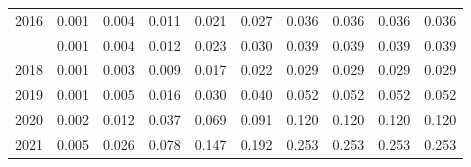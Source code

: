 \documentclass[
]{article}
\begin{document}
\begin{longtable}[t]{lrrrrrrrrr}
2016 & 0.001 & 0.004 & 0.011 & 0.021 & 0.027 & 0.036 & 0.036 & 0.036 & 0.036\\
\addlinespace
2017 & 0.001 & 0.004 & 0.012 & 0.023 & 0.030 & 0.039 & 0.039 & 0.039 & 0.039\\
2018 & 0.001 & 0.003 & 0.009 & 0.017 & 0.022 & 0.029 & 0.029 & 0.029 & 0.029\\
2019 & 0.001 & 0.005 & 0.016 & 0.030 & 0.040 & 0.052 & 0.052 & 0.052 & 0.052\\
2020 & 0.002 & 0.012 & 0.037 & 0.069 & 0.091 & 0.120 & 0.120 & 0.120 & 0.120\\
2021 & 0.005 & 0.026 & 0.078 & 0.147 & 0.192 & 0.253 & 0.253 & 0.253 & 0.253\\*
\end{longtable}
\end{document}
